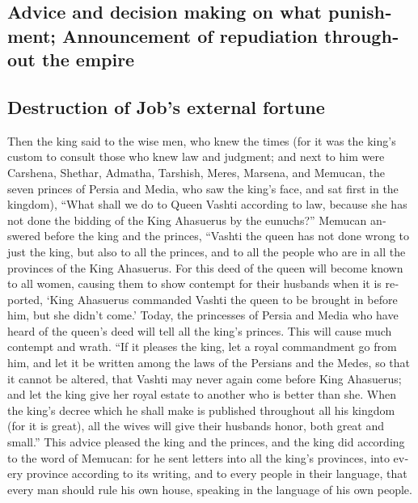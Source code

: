 \begin{paracol}{2}
\begin{otherlanguage}{english}
\hypertarget{advice-and-decision-making-on-what-punishment-announcement-of-repudiation-throughout-the-empire}{%
\subsection{Advice and decision making on what punishment; Announcement
of repudiation throughout the
empire}\label{advice-and-decision-making-on-what-punishment-announcement-of-repudiation-throughout-the-empire}}

\hypertarget{destruction-of-jobs-external-fortune}{%
\subsection{Destruction of Job's external
fortune}\label{destruction-of-jobs-external-fortune}}

 Then the king said to the wise men, who knew the times
(for it was the king's custom to consult those who knew law and
judgment;  and next to him were Carshena, Shethar,
Admatha, Tarshish, Meres, Marsena, and Memucan, the seven princes of
Persia and Media, who saw the king's face, and sat first in the
kingdom),  ``What shall we do to Queen Vashti according
to law, because she has not done the bidding of the King Ahasuerus by
the eunuchs?''  Memucan answered before the king and the
princes, ``Vashti the queen has not done wrong to just the king, but
also to all the princes, and to all the people who are in all the
provinces of the King Ahasuerus.  For this deed of the
queen will become known to all women, causing them to show contempt for
their husbands when it is reported, `King Ahasuerus commanded Vashti the
queen to be brought in before him, but she didn't come.' 
Today, the princesses of Persia and Media who have heard of the queen's
deed will tell all the king's princes. This will cause much contempt and
wrath.  ``If it pleases the king, let a royal commandment
go from him, and let it be written among the laws of the Persians and
the Medes, so that it cannot be altered, that Vashti may never again
come before King Ahasuerus; and let the king give her royal estate to
another who is better than she.  When the king's decree
which he shall make is published throughout all his kingdom (for it is
great), all the wives will give their husbands honor, both great and
small.''  This advice pleased the king and the princes,
and the king did according to the word of Memucan:  for
he sent letters into all the king's provinces, into every province
according to its writing, and to every people in their language, that
every man should rule his own house, speaking in the language of his own
people.


\end{otherlanguage}
\end{paracol}
